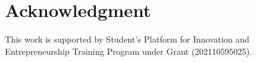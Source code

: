 \documentclass[10pt, conference, compsocconf]{IEEEtran}
\begin{document}
\section*{Acknowledgment}

This work is supported by Student’s Platform for Innovation and Entrepreneurship Training Program under Grant (202110595025).




%
%
%



\end{document}
